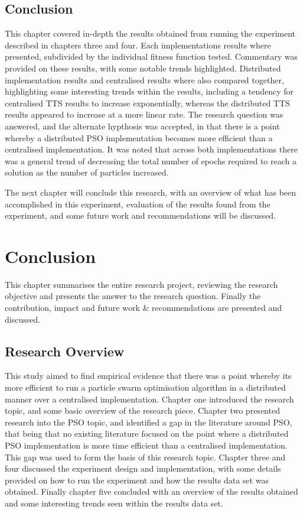 \documentclass[oneside,12pt]{book}
\begin{document}
\section{Conclusion}
This chapter covered in-depth the results obtained from running the experiment described in chapters three and four. Each implementations results where presented, subdivided by the individual fitness function tested. Commentary was provided on these results, with some notable trends highlighted. 
Distributed implementation results and centralised results where also compared together, highlighting some interesting trends within the results, including a tendency for centralised TTS results to increase exponentially, whereas the distributed TTS results appeared to increase at a more linear rate. The research question was answered, and the alternate hypthosis was accepted, in that there is a point whereby a distributed PSO implementation becomes more efficient than a centralised implementation. It was noted that across both implementations there was a general trend of decreasing the total number of epochs required to reach a solution as the number of particles increased.

The next chapter will conclude this research, with an overview of what has been accomplished in this experiment, evaluation of the results found from the experiment, and some future work and recommendations will be discussed. 


\chapter{Conclusion}
This chapter summarises the entire research project, reviewing the research objective and presents the answer to the research question. Finally the contribution, impact and future work \& recommendations are presented and discussed. 

\section{Research Overview}
This study aimed to find empirical evidence that there was a point whereby its  more  efficient  to  run a particle swarm optimisation algorithm in a distributed manner over a centralised implementation. Chapter one introduced the research topic, and some basic overview of the research piece. Chapter two presented research into the PSO topic, and identified a gap in the literature around PSO, that being that no existing literature focused on the point where a distributed PSO implementation is more time efficient than a centralised implementation. This gap was used to form the basis of this research topic. Chapter three and four discussed the experiment design and implementation, with some details provided on how to run the experiment and how the results data set was obtained. Finally chapter five concluded with an overview of the results obtained and some interesting trends seen within the results data set. 
\end{document}
